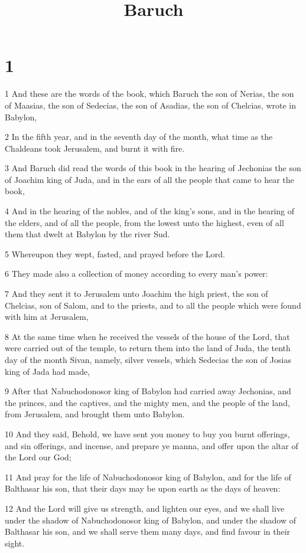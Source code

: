 

\title{Baruch}


\chapter{1}

\par 1 And these are the words of the book, which Baruch the son of Nerias, the son of Maasias, the son of Sedecias, the son of Asadias, the son of Chelcias, wrote in Babylon,
\par 2 In the fifth year, and in the seventh day of the month, what time as the Chaldeans took Jerusalem, and burnt it with fire.
\par 3 And Baruch did read the words of this book in the hearing of Jechonias the son of Joachim king of Juda, and in the ears of all the people that came to hear the book,
\par 4 And in the hearing of the nobles, and of the king's sons, and in the hearing of the elders, and of all the people, from the lowest unto the highest, even of all them that dwelt at Babylon by the river Sud.
\par 5 Whereupon they wept, fasted, and prayed before the Lord.
\par 6 They made also a collection of money according to every man's power:
\par 7 And they sent it to Jerusalem unto Joachim the high priest, the son of Chelcias, son of Salom, and to the priests, and to all the people which were found with him at Jerusalem,
\par 8 At the same time when he received the vessels of the house of the Lord, that were carried out of the temple, to return them into the land of Juda, the tenth day of the month Sivan, namely, silver vessels, which Sedecias the son of Josias king of Jada had made,
\par 9 After that Nabuchodonosor king of Babylon had carried away Jechonias, and the princes, and the captives, and the mighty men, and the people of the land, from Jerusalem, and brought them unto Babylon.
\par 10 And they said, Behold, we have sent you money to buy you burnt offerings, and sin offerings, and incense, and prepare ye manna, and offer upon the altar of the Lord our God;
\par 11 And pray for the life of Nabuchodonosor king of Babylon, and for the life of Balthasar his son, that their days may be upon earth as the days of heaven:
\par 12 And the Lord will give us strength, and lighten our eyes, and we shall live under the shadow of Nabuchodonosor king of Babylon, and under the shadow of Balthasar his son, and we shall serve them many days, and find favour in their sight.
